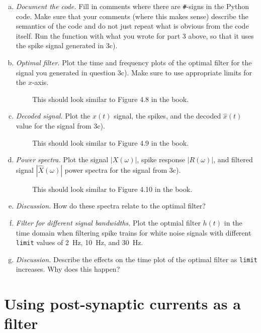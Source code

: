 	\begin{enumerate}[a)]
		\item {} \textit{Document the code.} Fill in comments where there are \texttt{\#}-signs in the Python code. Make sure that your comments (where this makes sense) describe the semantics of the code and do not just repeat what is obvious from the code itself. Run the function with what you wrote for part 3 above, so that it uses the spike signal generated in 3c).
		\item {} \textit{Optimal filter.} Plot the time and frequency plots of the optimal filter for the signal you generated in question 3c). Make sure to use appropriate limits for the $x$-axis.
		\begin{itemize}
			\item[{\symbolfont 📖}] This should look similar to Figure 4.8 in the book.
		\end{itemize}
		\item {} \textit{Decoded signal.} Plot the $x(t)$ signal, the spikes, and the decoded $\hat x(t)$ value for the signal from 3c).
		\begin{itemize}
			\item[{\symbolfont 📖}] This should look similar to Figure 4.9 in the book.
		\end{itemize}
		\item {} \textit{Power spectra.} Plot the signal $|X(\omega)|$, spike response $|R(\omega)|$, and filtered signal $|\hat X(\omega)|$ power spectra for the signal from 3c).
		\begin{itemize}
			\item[{\symbolfont 📖}] This should look similar to Figure 4.10 in the book.
		\end{itemize}
		\item {} \textit{Discussion.} How do these spectra relate to the optimal filter?
		\item {} \textit{Filter for different signal bandwidths.} Plot the optmial filter $h(t)$ in the time domain when filtering spike trains for white noise signals with different \texttt{limit} values of \SI{2}{\hertz}, \SI{10}{\hertz}, and \SI{30}{\hertz}.
		\item {} \textit{Discussion.} Describe the effects on the time plot of the optimal filter as \texttt{limit} increases. Why does this happen?
	\end{enumerate}

	\section{Using post-synaptic currents as a filter}

